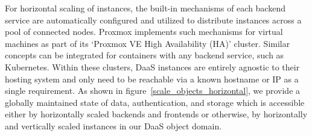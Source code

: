 \documentclass[runningheads]{llncs}
\begin{document}
For horizontal scaling of instances, the built-in mechanisms
of each backend service are automatically configured
and utilized to distribute instances across a pool of connected nodes.
Proxmox implements such mechanisms
for virtual machines as part of its `Proxmox VE High Availability (HA)' cluster.
Similar concepts can be integrated for containers with any backend service,
such as Kubernetes.
Within these clusters,
DaaS instances are entirely agnostic to their hosting system
and only need to be reachable
via a known hostname or IP as a single requirement.
As shown in figure~\ref{scale_objects_horizontal},
we provide a globally maintained state of data, authentication, and storage
which is accessible either by horizontally scaled backends and frontends
or otherwise,
by horizontally and vertically scaled instances in our DaaS object domain.
\end{document}
